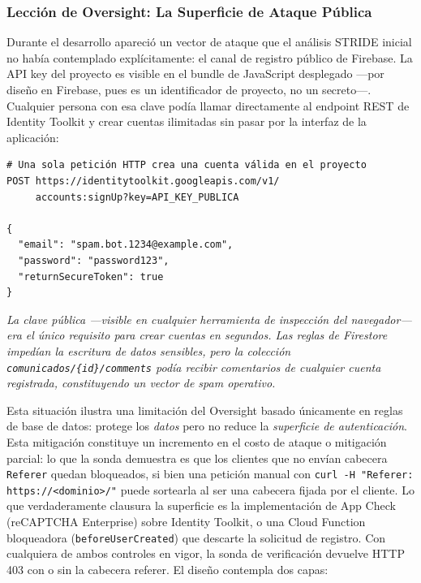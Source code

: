 \documentclass[14pt,a4paper,oneside]{extbook}
\begin{document}
\subsubsection{Lección de Oversight: La Superficie de Ataque Pública}

Durante el desarrollo apareció un vector de ataque que el análisis STRIDE inicial no había contemplado explícitamente: el canal de registro público de Firebase. La API key del proyecto es visible en el bundle de JavaScript desplegado ---por diseño en Firebase, pues es un identificador de proyecto, no un secreto---. Cualquier persona con esa clave podía llamar directamente al endpoint REST de Identity Toolkit y crear cuentas ilimitadas sin pasar por la interfaz de la aplicación:

\begin{tcolorbox}[
    colback=accent!5,
    colframe=accent!40,
    arc=5pt,
    title=Vector de ataque real: registro anónimo masivo vía REST
]
\begin{verbatim}
# Una sola petición HTTP crea una cuenta válida en el proyecto
POST https://identitytoolkit.googleapis.com/v1/
     accounts:signUp?key=API_KEY_PUBLICA

{
  "email": "spam.bot.1234@example.com",
  "password": "password123",
  "returnSecureToken": true
}
\end{verbatim}
\smallskip
\textit{La clave pública —visible en cualquier herramienta de inspección del navegador— era el único requisito para crear cuentas en segundos. Las reglas de Firestore impedían la escritura de datos sensibles, pero la colección \texttt{comunicados/\{id\}/comments} podía recibir comentarios de cualquier cuenta registrada, constituyendo un vector de spam operativo.}
\end{tcolorbox}

Esta situación ilustra una limitación del Oversight basado únicamente en reglas de base de datos: protege los \textit{datos} pero no reduce la \textit{superficie de autenticación}. Esta mitigación constituye un incremento en el costo de ataque o mitigación parcial: lo que la sonda demuestra es que los clientes que no envían cabecera \texttt{Referer} quedan bloqueados, si bien una petición manual con \verb|curl -H "Referer: https://<dominio>/"| puede sortearla al ser una cabecera fijada por el cliente. Lo que verdaderamente clausura la superficie es la implementación de App Check (reCAPTCHA Enterprise) sobre Identity Toolkit, o una Cloud Function bloqueadora (\texttt{beforeUserCreated}) que descarte la solicitud de registro. Con cualquiera de ambos controles en vigor, la sonda de verificación devuelve HTTP 403 con o sin la cabecera referer. El diseño contempla dos capas:
\end{document}
